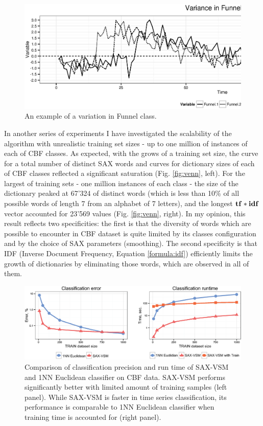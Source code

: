\begin{figure}[t!]
   \centering
   \includegraphics[width=140mm]{figures/funnels.ps}
   \caption{An example of a variation in Funnel class.}
   \label{fig:funnel}
\end{figure}

In another series of experiments I have investigated the scalability of the algorithm with
unrealistic training set sizes - up to one million of instances of each of CBF classes.
As expected, with the grows of a training set size, the curve for a total number of distinct SAX
words and curves for dictionary sizes of each of CBF classes reflected a significant saturation 
(Fig. \ref{fig:venn}, left). For the largest of training sets - one million instances of each
class - the size of the dictionary peaked at 67'324 of distinct words (which is less than 10\% of
all possible words of length 7 from an alphabet of 7 letters), 
and the longest $\text{\textbf{tf}}\ast\text{\textbf{idf}}$ vector 
accounted for 23'569 values (Fig. \ref{fig:venn}, right). In my opinion, this result reflects two
specificities: the first is that the diversity of words which are possible to encounter in 
CBF dataset is quite limited by its classes configuration and by the choice of SAX parameters 
(smoothing). 
The second specificity is that IDF (Inverse Document Frequency, Equation \ref{formula:idf})
efficiently limits the growth of dictionaries by eliminating those words, which are observed in all
of them.

\begin{figure}[t!]
   \centering
   \includegraphics[width=135mm]{figures/precision-runtime.eps}
   \caption{Comparison of classification precision and run time of SAX-VSM and 1NN 
   Euclidean classifier on CBF data. SAX-VSM performs significantly better with limited 
   amount of training samples (left panel). While SAX-VSM is faster in time series 
   classification, its performance is comparable to 1NN Euclidean classifier when 
   training time is accounted for (right panel).}
   \label{fig:precision-runtime}
\end{figure}


